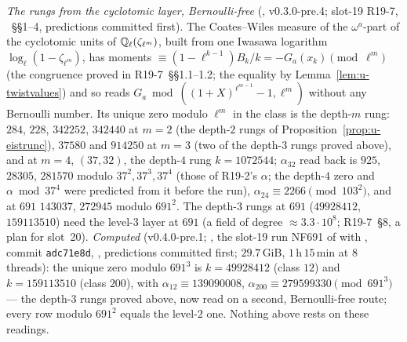 \documentclass[11pt]{article}
\begin{document}
\noindent\emph{The rungs from the cyclotomic layer, Bernoulli-free} (\COMP, v0.3.0-pre.4; slot-19 R19-7, ~\S\S1--4, predictions
committed first). The Coates--Wiles measure of the $\omega^{a}$-part of the cyclotomic units of $\mathbb{Q}_\ell(\zeta_{\ell^{m}})$, built from one Iwasawa logarithm
$\log_\ell(1-\zeta_{\ell^{m}})$, has moments $\equiv(1-\ell^{k-1})B_k/k=-G_a(x_k)\pmod{\ell^{m}}$ (the congruence proved in R19-7~\S\S1.1--1.2; the equality by Lemma~\ref{lem:u-twistvalues}) and so reads
$G_a\bmod((1+X)^{\ell^{m-1}}-1,\ell^{m})$ without any Bernoulli number. Its unique zero modulo $\ell^{m}$ in the class is the depth-$m$ rung: $284$, $228$, $342252$, $342440$ at $m=2$
(the depth-$2$ rungs of Proposition~\ref{prop:u-eistrunc}), $37580$ and $914250$ at $m=3$ (two of the depth-$3$ rungs proved above), and at $m=4$, $(37,32)$, the depth-$4$ rung
$k=1072544$; $\alpha_{32}$ read back is $925$, $28305$, $281570$ modulo $37^{2},37^{3},37^{4}$ (those of R19-2's $\alpha$; the depth-$4$ zero and $\alpha\bmod37^{4}$ were predicted
from it before the run), $\alpha_{24}\equiv2266\pmod{103^{2}}$, and at $691$ $143037$, $272945$ modulo $691^{2}$. The depth-$3$ rungs at $691$ ($49928412$, $159113510$) need the
level-$3$ layer at $691$ (a field of degree $\approx3.3\cdot10^{8}$; R19-7~\S8, a plan for slot~20). \emph{Computed} (v0.4.0-pre.1; \COMP, the slot-19 run NF691 of 
with , commit \texttt{adc71e8d}, , predictions committed first; $29.7$\,GiB, $1$\,h\,$15$\,min at
$8$ threads): the unique zero modulo $691^{3}$ is $k=49928412$ (class $12$) and $k=159113510$ (class $200$), with $\alpha_{12}\equiv139090008$, $\alpha_{200}\equiv279599330\pmod{691^{3}}$ ---
the depth-$3$ rungs proved above, now read on a second, Bernoulli-free route; every row modulo $691^{2}$ equals the level-$2$ one. Nothing above rests on these readings.
\end{document}

